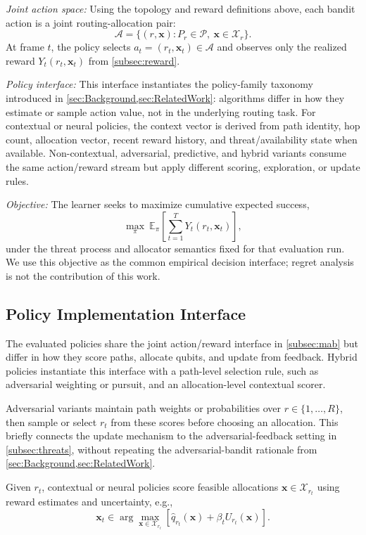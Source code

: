 \documentclass[10pt,conference]{IEEEtran}
\newcommand{\smallTitle}[1]{\vspace{1mm}\noindent\textit{#1:}}
\begin{document}
\smallTitle{Joint action space}
Using the topology and reward definitions above, each bandit action is a joint routing-allocation pair:
\[
\mathcal{A}=\{(r,\mathbf{x}) : P_r\in\mathcal{P},\ \mathbf{x}\in\mathcal{X}_r\}.
\]
At frame $t$, the policy selects $a_t=(r_t,\mathbf{x}_t)\in\mathcal{A}$ and observes only the realized reward $Y_t(r_t,\mathbf{x}_t)$ from \cref{subsec:reward}.

\smallTitle{Policy interface}
This interface instantiates the policy-family taxonomy introduced in \cref{sec:Background,sec:RelatedWork}: algorithms differ in how they estimate or sample action value, not in the underlying routing task. For contextual or neural policies, the context vector is derived from path identity, hop count, allocation vector, recent reward history, and threat/availability state when available. Non-contextual, adversarial, predictive, and hybrid variants consume the same action/reward stream but apply different scoring, exploration, or update rules.

\smallTitle{Objective}
The learner seeks to maximize cumulative expected success,
\[
\max_{\pi}\ \mathbb{E}_{\pi}\!\left[\sum_{t=1}^{T}Y_t(r_t,\mathbf{x}_t)\right],
\]
under the threat process and allocator semantics fixed for that evaluation run. We use this objective as the common empirical decision interface; regret analysis is not the contribution of this work.

\subsection{Policy Implementation Interface}
\label{subsec:framework}

The evaluated policies share the joint action/reward interface in \cref{subsec:mab} but differ in how they score paths, allocate qubits, and update from feedback. Hybrid policies instantiate this interface with a path-level selection rule, such as adversarial weighting or pursuit, and an allocation-level contextual scorer.

Adversarial variants maintain path weights or probabilities over $r\in\{1,\ldots,R\}$, then sample or select $r_t$ from these scores before choosing an allocation. This briefly connects the update mechanism to the adversarial-feedback setting in \cref{subsec:threats}, without repeating the adversarial-bandit rationale from \cref{sec:Background,sec:RelatedWork}.

Given $r_t$, contextual or neural policies score feasible allocations $\mathbf{x}\in\mathcal{X}_{r_t}$ using reward estimates and uncertainty, e.g.,
\[
\mathbf{x}_t \in \arg\max_{\mathbf{x}\in\mathcal{X}_{r_t}}
\left[\widehat{q}_{r_t}(\mathbf{x})+\beta_t U_{r_t}(\mathbf{x})\right].
\]
\end{document}
